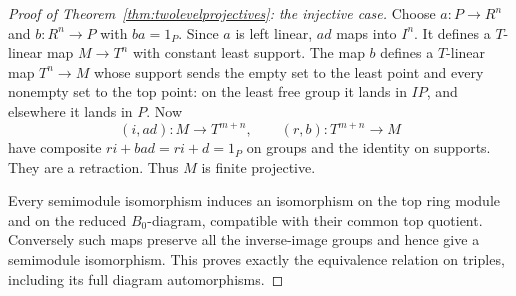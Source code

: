 \documentclass[11pt]{amsart}
\theoremstyle{definition}
\theoremstyle{remark}
\begin{document}
\begin{proof}[Proof of Theorem~\ref{thm:twolevelprojectives}: the injective case]
Choose $a:P\to R^n$ and $b:R^n\to P$ with $ba=1_P$. Since $a$ is left linear, $ad$ maps into $I^n$. It defines a $T$-linear map $M\to T^n$ with constant least support. The map $b$ defines a $T$-linear map $T^n\to M$ whose support sends the empty set to the least point and every nonempty set to the top point: on the least free group it lands in $IP$, and elsewhere it lands in $P$. Now
\[
 (i,ad):M\longrightarrow T^{m+n},\qquad
 (r,b):T^{m+n}\longrightarrow M
\]
have composite $ri+bad=ri+d=1_P$ on groups and the identity on supports. They are a retraction. Thus $M$ is finite projective.

Every semimodule isomorphism induces an isomorphism on the top ring module and on the reduced $B_0$-diagram, compatible with their common top quotient. Conversely such maps preserve all the inverse-image groups and hence give a semimodule isomorphism. This proves exactly the equivalence relation on triples, including its full diagram automorphisms.
\end{proof}
\end{document}
